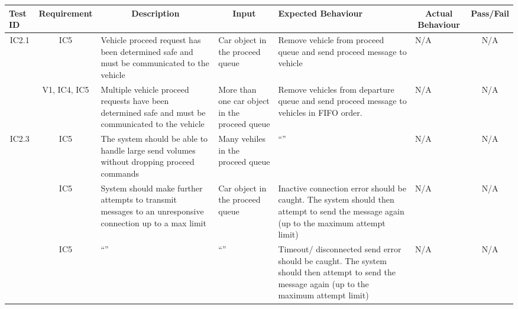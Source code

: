 \documentclass [10pt]{article}
\begin{document}
    
 \begin{longtable}{ | p{ } | p{ } |  p{ } |  p{ } | p{ } | p{ } |  p{ } |}  \hline

    \rowcolor{subsectionC}\textbf{Test ID}
    & \multicolumn{1}{c|}{\textbf{Requirement} }
    &\multicolumn{1}{c|}{\textbf{Description} }
    & \multicolumn{1}{c|}{\textbf{Input} }
    & \textbf{Expected Behaviour} 
    & \multicolumn{1}{c|}{\textbf{Actual Behaviour} }
    & \multicolumn{1}{c|}{\textbf{Pass/Fail}} \\  \hline
    
   
    \multicolumn{1}{|c|}{IC2.1} 
    & \multicolumn{1}{c|}{IC5}
    & Vehicle proceed request has been determined safe and must be communicated to the vehicle
    & Car object in the proceed queue
    & Remove vehicle from proceed queue and send proceed message to vehicle 
    & N/A
    & \multicolumn{1}{c|}{N/A}\\ \hline
    
  
    \rowcolor{tableCell}\multicolumn{1}{|c|}{IC2.2} 
    & \multicolumn{1}{c|}{V1, IC4, IC5}
    & Multiple vehicle proceed requests have been determined safe and must be communicated to the vehicle
    & More than one car object in the proceed queue
    & Remove vehicles from departure queue and send proceed message to vehicles in FIFO order.  
    & N/A
    & \multicolumn{1}{c|}{N/A}\\ \hline
    
    
    \multicolumn{1}{|c|}{IC2.3} 
    & \multicolumn{1}{c|}{IC5}
    & The system should be able to handle large send volumes without dropping proceed commands
    & Many vehiles in the proceed queue
    & ``''
    & N/A
    & \multicolumn{1}{c|}{N/A}\\ \hline
    
    
   
    \rowcolor{tableCell}\multicolumn{1}{|c|}{IC2.4} 
    & \multicolumn{1}{c|}{IC5}
    & System should make further attempts to transmit messages to an unresponsive connection  up to a max limit 
    & Car object in the proceed queue
    & Inactive connection error should be caught. The system should then attempt to send the message again (up to the maximum attempt limit)
    & N/A
    & \multicolumn{1}{c|}{N/A}\\  \hline
    
    \pagebreak \hline
   
    
    \multicolumn{1}{|c|}{IC2.5} 
    & \multicolumn{1}{c|}{IC5}
    & ``''
    & ``'' 
    &  Timeout/ disconnected send error should be caught.  The system should then attempt to send the message again (up to the maximum attempt limit)
    & N/A
    & \multicolumn{1}{c|}{N/A}\\ \hline
    
    \end{longtable}
    
\end{document}

